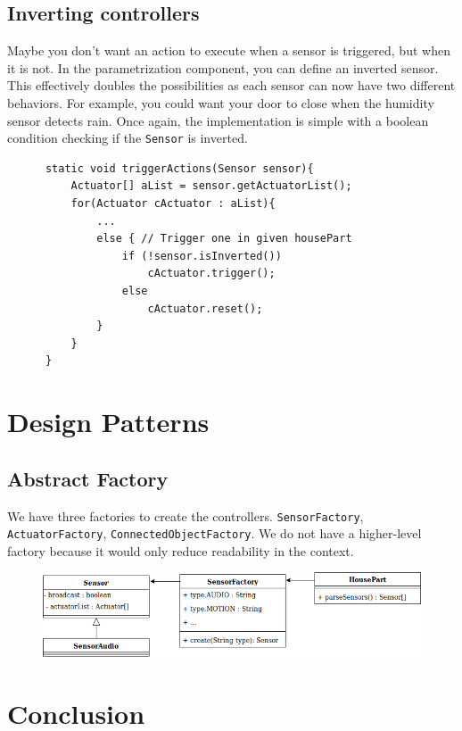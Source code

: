     \subsection{Inverting controllers}
      Maybe you don't want an action to execute when a sensor is triggered, but when it is not. In the parametrization component, you can define an inverted sensor. This effectively doubles the possibilities as each sensor can now have two different behaviors. For example, you could want your door to close when the humidity sensor detects rain. Once again, the implementation is simple with a boolean condition checking if the \texttt{Sensor} is inverted.
      \begin{verbatim}
      static void triggerActions(Sensor sensor){
          Actuator[] aList = sensor.getActuatorList();
          for(Actuator cActuator : aList){
              ...
              else { // Trigger one in given housePart
                  if (!sensor.isInverted())
                      cActuator.trigger();
                  else
                      cActuator.reset();
              }
          }
      }
      \end{verbatim}

  \section{Design Patterns}
    \subsection{Abstract Factory}
      We have three factories to create the controllers. \texttt{SensorFactory}, \texttt{ActuatorFactory}, \texttt{ConnectedObjectFactory}. We do not have a higher-level factory because it would only reduce readability in the context.
      \begin{figure}[!h]
        \includegraphics[width=\textwidth]{sensorfactory.png}
      \end{figure}

	\section{Conclusion}


